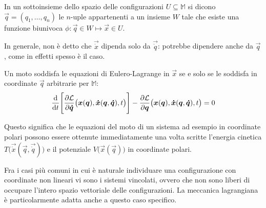 \begin{definition}
  In un sottoinsieme dello spazio delle configurazioni $U \subseteq \mathbb{M}$ si dicono  $\vec{q}=(q_1, \ldots, q_n)$ le $n$-uple appartenenti a un insieme $W$ tale che esiste una funzione biunivoca $\phi: \vec{q} \in W \mapsto \vec{x}\in U$.
\end{definition}
\begin{remark}
  In generale, non è detto che $\vec{\dot{x}}$ dipenda solo da $\vec{\dot{q}}$: potrebbe dipendere anche da $\vec{q}$, come in effetti spesso è il caso.
\end{remark}
\begin{theorem}
  Un moto soddisfa le equazioni di Eulero-Lagrange in $\vec{x}$ se e solo se le soddisfa in coordinate $\vec{q}$ arbitrarie per $\mathbb{M}$: \begin{equation*}
    \dv{t}\Bigg[\pdv{\mathcal{L}}{\boldsymbol{\dot{q}}}()\big(\boldsymbol{x}(\boldsymbol{q}), \boldsymbol{\dot{x}}(\boldsymbol{q},\boldsymbol{\dot{q}}), t\big)\Bigg] - \pdv{\mathcal{L}}{\boldsymbol{q}}()\big(\boldsymbol{x}(\boldsymbol{q}), \boldsymbol{\dot{x}}(\boldsymbol{q},\boldsymbol{\dot{q}}), t\big) = 0
  \end{equation*} 
\end{theorem}

Questo significa che le equazioni del moto di un sistema ad esempio in coordinate polari possono essere ottenute immediatamente una volta scritte l'energia cinetica $T\big(\vec{\dot{x}}(\vec{q},\vec{\dot{q}})\big)$ e il potenziale $V\big(\vec{x}(\vec{q})\big)$ in coordinate polari.

Fra i casi più comuni in cui è naturale individuare una configurazione con coordinate non lineari vi sono i sistemi vincolati, ovvero che non sono liberi di occupare l'intero spazio vettoriale delle configurazioni. La meccanica lagrangiana è particolarmente adatta anche a questo caso specifico.

